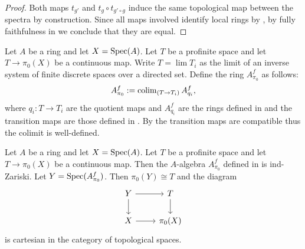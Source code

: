 \begin{proof}
  Both maps \(t_{g'}\) and \(t_{g} \circ t_{g' \circ g}\) induce the same topological map between the spectra by construction. Since all maps involved identify local rings by , by fully faithfulness in  we conclude that they are equal.
\end{proof}

\begin{definition}
  \label{def:modify-pi0-profinite}
  Let $A$ be a ring and let $X = \operatorname{Spec} (A)$. Let $T$ be a profinite space and let $T \to \pi_0(X)$ be a continuous map. Write $T = \lim T_i$ as the limit of an inverse system of finite discrete spaces over a directed set. Define the ring \(A^f_{\pi_0}\) as follows:
  \[
    A^f_{\pi_0} := \operatorname{colim}_{(T \to T_i)} A^f_{q_i},
  \]
  where \(q_i : T \to T_i\) are the quotient maps and \(A^f_{q_i}\) are the rings defined in  and the transition maps are those defined in . By  the transition maps are compatible thus the colimit is well-defined.
\end{definition}

\begin{lemma}
  \label{thm:modify-pi0-profinite-properties}
  Let $A$ be a ring and let $X = \operatorname{Spec} (A)$. Let $T$ be a profinite space and let $T \to \pi_0(X)$ be a continuous map. Then the $A$-algebra $A^f_{\pi_0}$ defined in  is ind-Zariski. Let $Y = \operatorname{Spec} (A^f_{\pi_0})$. Then $\pi_0(Y) \cong T$ and the diagram
  \[
  \begin{tikzcd}
  Y \arrow[r] \arrow[d] & T \arrow[d] \\
  X \arrow[r] & \pi_0(X)
  \end{tikzcd}
  \]
  is cartesian in the category of topological spaces.
\end{lemma}

